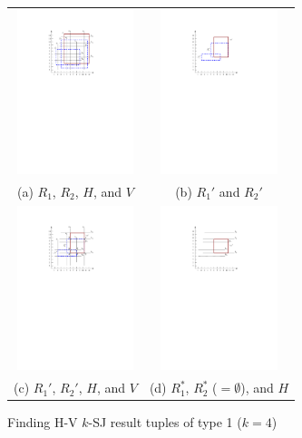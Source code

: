 \documentclass[acmsmall,review,anonymous]{acmart}
\def\figcapup{\vspace{-2mm}}
\def\figcapdown{\vspace{-3mm}}
\begin{document}
\begin{figure}
    \begin{tabular}{cc}
        \includegraphics[height=48mm]{./artwork/alg-ex1-a} &
        \includegraphics[height=48mm]{./artwork/alg-ex1-b} \\
        (a) $R_1$, $R_2$, $H$, and $V$ &
        (b) $R_1'$ and $R_2'$ \\[2mm]
        \includegraphics[height=48mm]{./artwork/alg-ex1-c} &
        \includegraphics[height=48mm]{./artwork/alg-ex1-d} \\
        (c) $R_1'$, $R_2'$, $H$, and $V$ &
        (d) $R_1^*$, $R_2^*$ ($= \emptyset$), and $H$
    \end{tabular}
    \figcapup
    \caption{Finding H-V $k$-SJ result tuples of type 1 ($k = 4$)}
    \label{fig:hv:type1:ex}
    \figcapdown
\end{figure}
\end{document}
